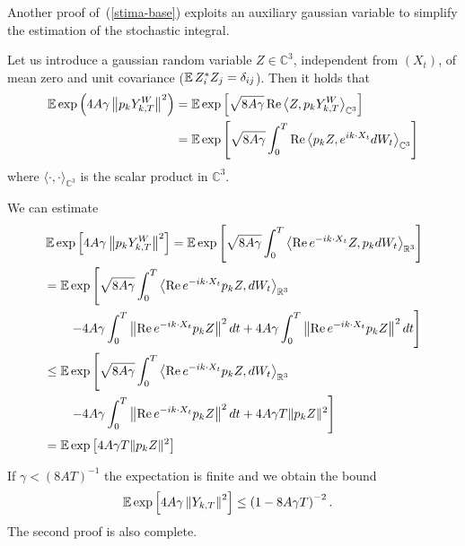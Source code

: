 Another proof of~(\ref{stima-base})
exploits an auxiliary gaussian variable to simplify the estimation of
the stochastic integral.

Let us introduce a gaussian random variable $Z\in\mathbb{C}^{3}$,
independent from $(X_t)$, of mean zero and unit 
covariance ($\operatorname{{\mathbb E}} Z_{i}^{*} Z_{j} = \delta_{ij}$). 
Then it holds that 
\begin{equation}
\begin{split}
\operatorname{{\mathbb E}} \exp \left(  4 A\gamma \left\|
p_k Y^W_{k,T} \right\|^{2}
\right) & = 
\operatorname{{\mathbb E}} \exp\left[
  \sqrt{8 A \gamma} \operatorname{Re} \left \langle Z,p_k Y^W_{k,T}
\right\rangle_{\mathbb{C}^3} \right] 
\\ &=
\operatorname{{\mathbb E}}  
\exp\left[  \sqrt{8 A \gamma} \int_{0}^{T} \operatorname{Re} \left \langle p_k Z,
e^{ik\cdot X_{t}} dW_{t}
\right \rangle_{\mathbb{C}^3} \right] 
\end{split}
\label{gaussiantrick1}
\end{equation}
where $\langle \cdot,\cdot \rangle_{\mathbb{C}^3}$ is the scalar product in $\mathbb{C}^3$.

We can estimate
\begin{equation}
\begin{split}
& \operatorname{{\mathbb E}}\exp\left[  4 A\gamma \left\|
p_k Y^W_{k,T} \right\|^{2}
\right]  =
\operatorname{{\mathbb E}}  
\exp\left[  \sqrt{8 A \gamma} \int_{0}^{T} \left\langle
\operatorname{Re} e^{-ik\cdot X_{t}} Z, p_k dW_{t}
\right\rangle_{\mathbb{R}^3} 
\right]
\\ & =  \operatorname{{\mathbb E}}   \exp\left[  
\sqrt{8 A \gamma} \int_{0}^{T} \left\langle
\operatorname{Re} e^{-ik\cdot X_{t}} p_k Z, dW_{t}
\right\rangle_{\mathbb{R}^3} 
\right. \\ & \left. \qquad
-  4 A \gamma \int_0^T  
\left\| \operatorname{Re} e^{-ik\cdot X_{t}} p_k Z \right\|^2 dt
+  4 A \gamma \int_0^T  
\left\| \operatorname{Re} e^{-ik\cdot X_{t}} p_k Z \right\|^2 dt
\right]
\\ & \le  \operatorname{{\mathbb E}}   \exp\left[  
\sqrt{8 A \gamma} \int_{0}^{T} \left\langle
\operatorname{Re} e^{-ik\cdot X_{t}} p_k Z, dW_{t}
\right\rangle_{\mathbb{R}^3} 
\right. \\ & \left. \qquad
-  4 A \gamma \int_0^T  
\left\| \operatorname{Re} e^{-ik\cdot X_{t}} p_k Z \right\|^2 dt
+  4 A \gamma T \|p_k Z\|^2 
\right]
\\ & =  \operatorname{{\mathbb E}}   \exp\left[  
  4 A \gamma T \|p_k Z\|^2 
\right]
\end{split}
\label{gt_secondbound}
\end{equation}

If $\gamma < (8AT)^{-1}$ the expectation is finite and we 
obtain the bound
\begin{equation*}
\begin{split}
& \operatorname{{\mathbb E}}\exp\left[  4 A\gamma \left\|
Y_{k,T} \right\|^{2}
\right]   \le
\left( 1- 8 A \gamma T \right)^{-2}.
\end{split}
\end{equation*}
The second proof is also complete.

